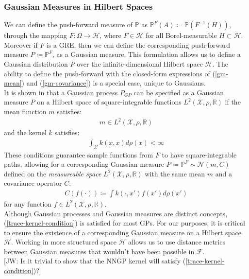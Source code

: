 \documentclass{article}
\newcommand{\jw}[1]{{\color{gray} [JW: #1]}}
\numberwithin{equation}{section}
\begin{document}
\subsubsection{Gaussian Measures in Hilbert Spaces}
We can define the push-forward measure of $\mathbb{P}$ as $\mathbb{P}^{F}(A) \coloneqq \mathbb{P}(F^{-1}(H))$, through the mapping $F: \Omega \rightarrow \mathcal{H}$, where $F \in \mathcal{H}$ for all Borel-measurable $H \subset \mathcal{H}$. Moreover if $F$ is a GRE, then we can define the corresponding push-forward measure $P \coloneqq \mathbb{P}^{F}$, as a Gaussian measure. This formulation allows us to define a Gaussian distribution $P$ over the infinite-dimensional Hilbert space $\mathcal{H}$. The ability to define the push-forward with the closed-form expressions of (\ref{gm-mean}) and (\ref{gm-covariance}) is a special case, unique to Gaussians.
\newline
\\It is shown in \cite{wild2022generalized} that a Gaussian process $P_{GP}$ can be specified as a Gaussian measure $P$ on a Hilbert space of square-integrable functions $L^2(\mathcal{X}, \rho, \mathbb{R})$ if the mean function $m$ satisfies:
\begin{align}
    \label{smooth-mean-function-condition}
    m \in L^2(\mathcal{X}, \rho, \mathbb{R})
\end{align}
and the kernel $k$ satisfies:
\begin{align}
    \int_{\mathcal{X}} k(x, x) d\rho(x) < \infty
    \label{trace-kernel-condition}
\end{align}
These conditions guarantee sample functions from $F$ to have square-integrable paths, allowing for a corresponding Gaussian measure $P \coloneqq \mathbb{P}^F \sim \mathcal{N}(m, C)$ defined on the \textit{measureable space} $L^2(\mathcal{X}, \rho, \mathbb{R})$ with the same mean $m$ and a covariance operator $C$:
\begin{align}
    C(f(\cdot)) \coloneqq \int k(\cdot, x')f(x')d \rho(x')
    \label{gm-covariance-operator}
\end{align}
for any function $f \in L^2(\mathcal{X}, \rho, \mathbb{R})$. \\
\newline
Although Gaussian processes and Gaussian measures are distinct concepts, (\ref{trace-kernel-condition}) is satisfied for most GPs. For our purposes, it is critical to ensure the existence of a corresponding Gaussian measure on a Hilbert space $\mathcal{H}$. Working in more structured space $\mathcal{H}$ allows us to use distance metrics between Gaussian measures that wouldn't have been possible in $\mathcal{F}$.
\\\jw{Is it trivial to show that the NNGP kernel will satisfy (\ref{trace-kernel-condition})?}
\end{document}
